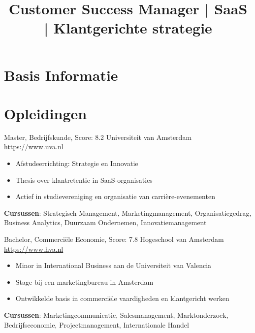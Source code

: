 \documentclass[a4paper, serif, 10pt]{moderncv}
\title{Customer Success Manager | SaaS | Klantgerichte strategie}
\begin{document}
\maketitle

\section{Basis Informatie}

\section{Opleidingen}

        {Master, Bedrijfskunde, Score: 8.2}
        {Universiteit van Amsterdam}
        {\url{https://www.uva.nl}}
        {}
        {\begin{itemize}
\item Afstudeerrichting: Strategie en Innovatie
\item Thesis over klantretentie in SaaS-organisaties
\item Actief in studievereniging en organisatie van carrière-evenementen
\end{itemize}
\textbf{Cursussen}: Strategisch Management, Marketingmanagement, Organisatiegedrag, Business Analytics, Duurzaam Ondernemen, Innovatiemanagement}

        {Bachelor, Commerciële Economie, Score: 7.8}
        {Hogeschool van Amsterdam}
        {\url{https://www.hva.nl}}
        {}
        {\begin{itemize}
\item Minor in International Business aan de Universiteit van Valencia
\item Stage bij een marketingbureau in Amsterdam
\item Ontwikkelde basis in commerciële vaardigheden en klantgericht werken
\end{itemize}
\textbf{Cursussen}: Marketingcommunicatie, Salesmanagement, Marktonderzoek, Bedrijfseconomie, Projectmanagement, Internationale Handel}
\end{document}
